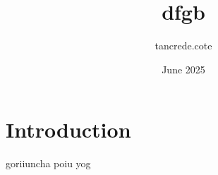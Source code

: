 \documentclass{article}
\title{dfgb}
\author{tancrede.cote }
\date{June 2025}
\begin{document}
\maketitle

\section{Introduction}


goriiuncha
poiu
yog
\end{document}
